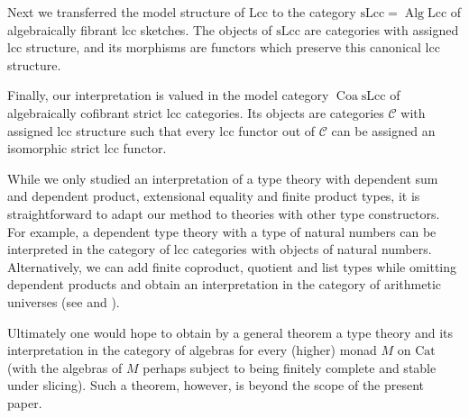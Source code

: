 \documentclass[a4paper]{article}
\theoremstyle{remark}
\theoremstyle{definition}
\begin{document}
Next we transferred the model structure of $\mathrm{Lcc}$ to the category $\mathrm{sLcc} = \operatorname{Alg} \mathrm{Lcc}$ of algebraically fibrant lcc sketches.
The objects of $\mathrm{sLcc}$ are categories with assigned lcc structure, and its morphisms are functors which preserve this canonical lcc structure.

Finally, our interpretation is valued in the model category $\operatorname{Coa} \mathrm{sLcc}$ of algebraically cofibrant strict lcc categories.
Its objects are categories $\mathcal{C}$ with assigned lcc structure such that every lcc functor out of $\mathcal{C}$ can be assigned an isomorphic strict lcc functor.

While we only studied an interpretation of a type theory with dependent sum and dependent product, extensional equality and finite product types, it is straightforward to adapt our method to theories with other type constructors.
For example, a dependent type theory with a type of natural numbers can be interpreted in the category of lcc categories with objects of natural numbers.
Alternatively, we can add finite coproduct, quotient and list types while omitting dependent products and obtain an interpretation in the category of arithmetic universes (see \cite{au-as-list-arithmetic-pretopos} and \cite{au-sketches}).

Ultimately one would hope to obtain by a general theorem a type theory and its interpretation in the category of algebras for every (higher) monad $M$ on $\mathrm{Cat}$ (with the algebras of $M$ perhaps subject to being finitely complete and stable under slicing).
Such a theorem, however, is beyond the scope of the present paper.




\end{document}
